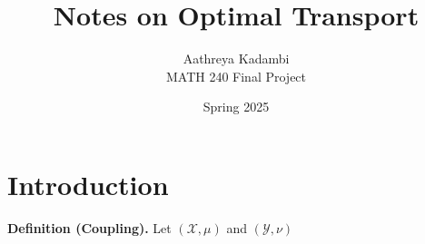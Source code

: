 \documentclass{article}
\title{Notes on Optimal Transport}
\author{Aathreya Kadambi\\
MATH 240 Final Project}
\date{Spring 2025}
\begin{document}
\maketitle

\section{Introduction}

\textbf{Definition (Coupling).} Let $(\mathcal{X}, \mu)$ and $(\mathcal{Y}, \nu)$ 
\end{document}
